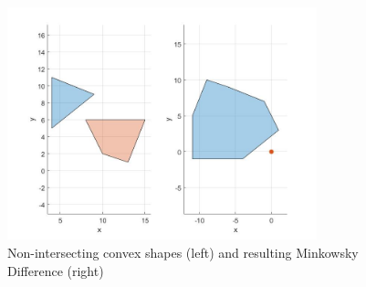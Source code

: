 \begin{figure}
\centering
\includegraphics[width=0.8\textwidth]{Images/nonintersectingshapes.jpg}
\caption{Non-intersecting convex shapes (left) and resulting Minkowsky Difference (right)}
\label{fig:nonintersectingshapes}
\end{figure}

